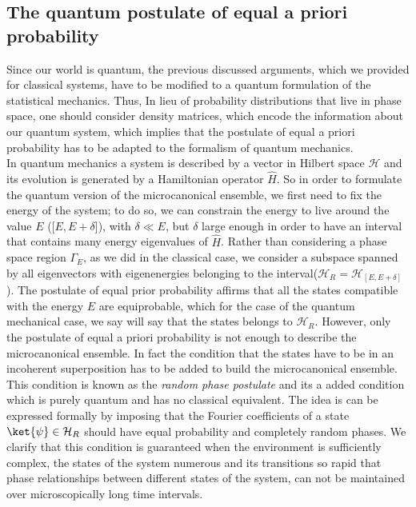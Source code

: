 \subsection{The quantum postulate of equal a priori probability}
Since our world is quantum, the previous discussed arguments, which we provided for classical systems, have to be modified to a quantum formulation of the statistical mechanics. Thus, In lieu of probability distributions that live in phase space, one should consider density matrices, which encode the information about our quantum system, which implies that the postulate of equal a priori probability has to be adapted to the formalism of quantum mechanics.\\
\indent In quantum mechanics a system is described by a vector in Hilbert space $\mathcal{H}$ and its evolution is generated by a Hamiltonian operator $\hat{H}$. So in order to formulate the quantum version of the microcanonical ensemble, we first need to fix the energy of the system; to do so, we can constrain the energy to live around the value $E$ ([$E,E+\delta$]), with $\delta\ll E$, but $\delta$ large enough in order to have an interval that contains many energy eigenvalues of $\hat{H}$. Rather than considering a phase space region $\Gamma_{E}$, as we did in the classical case, we consider a subspace spanned by all eigenvectors with eigenenergies belonging to the interval($\mathcal{H}_{R}=\mathcal{H}_{[E,E+\delta]}$). The postulate of equal prior probability affirms that all the states compatible with the energy $E$ are equiprobable, which for the case of the quantum mechanical case, we say will say that the states belongs to $\mathcal{H}_R$. 
However, only the postulate of equal a priori probability is not enough to describe the microcanonical ensemble. In fact the condition that the states have to be in an incoherent superposition has to be added to build the microcanonical ensemble. This condition is known as the \textit{random phase postulate} and its a added condition which is purely quantum and has no classical equivalent. The idea is can be expressed formally by imposing that the Fourier coefficients of a state $\ket{\psi}\in \mathcal{H}_{R}$ should have equal probability and completely random phases. We clarify that this condition is guaranteed when the environment is sufficiently complex, the states of the system numerous and its transitions so rapid that phase relationships between different states of the system, can not be maintained over microscopically long time intervals\cite{huang_statistical_1987}.\\


